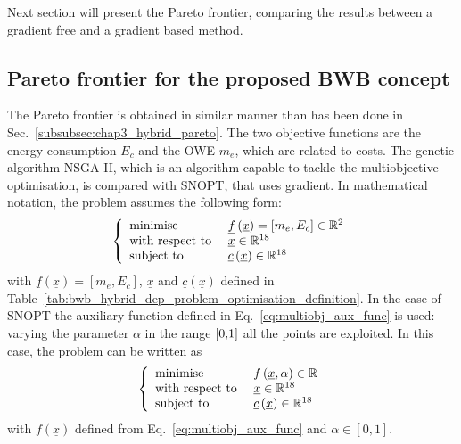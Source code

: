 Next section will present the Pareto frontier, comparing the results between a gradient free and a gradient based method. 

\subsection{Pareto frontier for the proposed BWB concept}
\label{subsec:chap4_bwb_pareto}

The Pareto frontier is obtained in similar manner than has been done in Sec.~\ref{subsubsec:chap3_hybrid_pareto}. 
The two objective functions are the energy consumption $E_c$ and the OWE $m_e$, which are related to costs. 
The genetic algorithm NSGA-II, which is an algorithm capable to tackle the multiobjective optimisation, is compared with SNOPT, that uses gradient. 
In mathematical notation, the problem assumes the following form: 
\begin{equation*}
	\left\{\begin{array}{l l}
		\textrm{minimise } & \underline{f}\left(\underline{x}\right)=\left[m_e, E_c\right]\in\mathbb{R}^{2} \\
		\textrm{with respect to } & \underline{x}\in\mathbb{R}^{18} \\
		\textrm{subject to } & \underline{c}\left(\underline{x}\right)\in\mathbb{R}^{18} \\						 
	\end{array}\right.
\end{equation*}
with $\underline{f}\left(\underline{x}\right)=\left[m_e, E_c\right]$, $\underline{x}$ and $\underline{c}\left(\underline{x}\right)$ defined in Table~\ref{tab:bwb_hybrid_dep_problem_optimisation_definition}. 
In the case of SNOPT the auxiliary function defined in Eq.~\eqref{eq:multiobj_aux_func} is used: varying the parameter $\alpha$ in the range $\hbox{[0,1]}$ all the points are exploited. 
In this case, the problem can be written as
\begin{equation*}
	\left\{\begin{array}{l l}
		\textrm{minimise } & f\left(\underline{x}, \alpha\right)\in\mathbb{R}  \\
		\textrm{with respect to } & \underline{x}\in\mathbb{R}^{18} \\
		\textrm{subject to } & \underline{c}\left(\underline{x}\right)\in\mathbb{R}^{18} \\						 
	\end{array}\right.
\end{equation*}
with $f\left(\underline{x}\right)$ defined from Eq.~\eqref{eq:multiobj_aux_func} and $\alpha\in[0,1]$.

